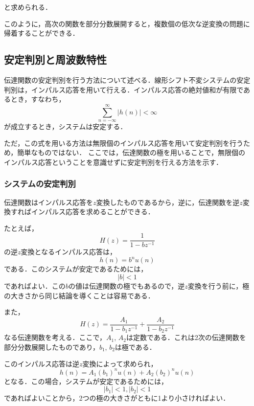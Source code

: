\noindent と求められる．

このように，高次の関数を部分分数展開すると，複数個の低次な逆変換の問題に帰着することができる．

\subsection{安定判別と周波数特性}

伝達関数の安定判別を行う方法について述べる．線形シフト不変システムの安定判別は，インパルス応答を用いて行える．インパルス応答の絶対値和が有限であるとき，すなわち，
\begin{equation}
\sum_{n=-\infty}^{\infty}|h(n)|<\infty
\end{equation}
が成立するとき，システムは安定する．

ただ，この式を用いる方法は無限個のインパルス応答を用いて安定判別を行うため，簡単なものではない．
%
ここでは，伝達関数の極を用いることで，無限個のインパルス応答ということを意識せずに安定判別を行える方法を示す．

\subsubsection{システムの安定判別}

伝達関数はインパルス応答を$z$変換したものであるから，逆に，伝達関数を逆$z$変換すればインパルス応答を求めることができる．

たとえば，
\begin{equation}
H(z)=\frac{1}{1-bz^{-1}}
\end{equation}
の逆$z$変換となるインパルス応答は，
\begin{equation}
h(n)=b^n u(n)
\end{equation}
である．このシステムが安定であるためには，
\begin{equation}
|b|<1
\end{equation}
であればよい．この$b$の値は伝達関数の極でもあるので，逆$z$変換を行う前に，極の大きさから同じ結論を導くことは容易である．

また，
\begin{equation}
H(z)=\frac{A_1}{1-b_1z^{-1}}+\frac{A_2}{1-b_2z^{-1}}
\end{equation}
なる伝達関数を考える．ここで，$A_1$, $A_2$は定数である．これは2次の伝達関数を部分分数展開したものであり，$b_1$, $b_2$は極である．

このインパルス応答は逆$z$変換によって求められ，
\begin{equation}
h(n)=A_1(b_1)^n u(n)+A_2(b_2)^n u(n)
\end{equation}
となる．この場合，システムが安定であるためには，
\begin{equation}
|b_1|<1, |b_2|<1
\end{equation}
であればよいことから，2つの極の大きさがともに1より小さければよい．

